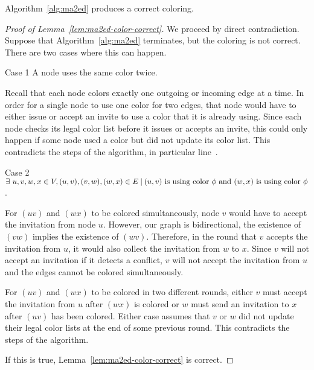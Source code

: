 \begin{lem}
\label{lem:ma2ed-color-correct}
Algorithm~\ref{alg:ma2ed} produces a correct coloring.
\end{lem}
\begin{proof}[Proof of Lemma~\ref{lem:ma2ed-color-correct}]
We proceed by direct contradiction. Suppose that Algorithm~\ref{alg:ma2ed} terminates, but the coloring is not correct. There are two cases where this can happen.
\begin{paragraph}{Case 1} A node uses the same color twice.

Recall that each node colors exactly one outgoing or incoming edge at a time. In order for a single node to use one color for two edges, that node would have to either issue or accept an invite to use a color that it is already using. Since each node checks its legal color list before it issues or accepts an invite, this could only happen if some node used a color but did not update its color list. This contradicts the steps of the algorithm, in particular line~.
\end{paragraph}
\begin{paragraph}{Case 2} $\exists\ u,v,w,x \in V, (u,v), (v,w), (w,x) \in E {\: |\:} (u,v) \text{ is using color } \phi \text{ and } (w,x)\text{ is using color } \phi$.

For $(uv)$ and $(wx)$ to be colored simultaneously, node $v$ would have to accept the invitation from node $u$. However, our graph is bidirectional, the existence of $(vw)$ implies the existence of $(wv)$. Therefore, in the round that $v$ accepts the invitation from $u$, it would also collect the invitation from $w$ to $x$. Since $v$ will not accept an invitation if it detects a conflict, $v$ will not accept the invitation from $u$ and the edges cannot be colored simultaneously.

For $(uv)$ and $(wx)$ to be colored in two different rounds, either $v$ must accept the invitation from $u$ after $(wx)$ is colored or $w$ must send an invitation to $x$ after $(uv)$ has been colored. Either case assumes that $v$ or $w$ did not update their legal color lists at the end of some previous round. This contradicts the steps of the algorithm.
\end{paragraph}
If this is true, Lemma~\ref{lem:ma2ed-color-correct} is correct.
\end{proof}

